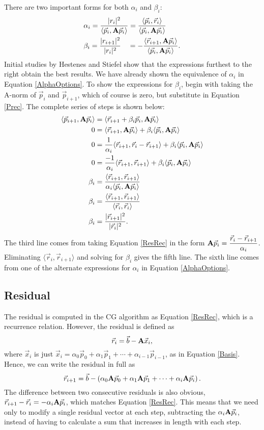 \documentclass[11pt,letterpaper,oneside,notitlepage]{article}	%
\newcommand{\bfa}{{\bf A}}						%
\newcommand{\ip}[2]{\langle \vec #1,\vec #2 \rangle}	%
\newcommand{\aip}[2]{\langle \vec #1,\bfa\vec #2 \rangle}	%
\newcommand{\eq}[1]{Equation \eqref{#1}}		%
\newcommand{\pindent}[1]{\hspace{6mm}}  		%
\numberwithin{equation}{section}				%
\begin{document}
There are two important forms for both $\alpha_i$ and $\beta_i$: 
\begin{align}
&\alpha_i = \dfrac{|r_i|^2}{\aip{p_i}{p_i}} = \dfrac{\ip{p_i}{r_i}}{\aip{p_i}{p_i}} \\
&\beta_i = \dfrac{|r_{i+1}|^2}{|r_i|^2} \quad= -\dfrac{\aip{r_{i+1}}{p_i}}{\aip{p_i}{p_i}}
.\end{align}
Initial studies by Hestenes and Stiefel show that the expressions furthest to the right obtain the best results\cite{CG1952}.  We have already shown the equivalence of $\alpha_i$ in \eq{AlphaOptions}. To show the expressions for $\beta_i$, begin with taking the A-norm of $\vec p_i$ and $\vec p_{i+1}$, which of course is zero, but substitute in \eq{Prec}. The complete series of steps is shown below:
\begin{align*}
\aip{p_{i+1}}{p_i} &= \aip{r_{i+1}+\beta_i\vec p_i}{p_i} \\
0&= \aip{r_{i+1}}{p_i}+\beta_i\aip{p_i}{p_i} \\ 
0&= \frac{1}{\alpha_i}\ip{r_{i+1}}{r_i-\vec r_{i+1}}+\beta_i\aip{p_i}{p_i} \\
0&= \frac{-1}{\alpha_i}\ip{r_{i+1}}{r_{i+1}}+\beta_i\aip{p_i}{p_i} \\
\beta_i &= \dfrac{\ip{r_{i+1}}{r_{i+1}}}{\alpha_i\aip{p_i}{p_i}} \\
\beta_i &= \dfrac{\ip{r_{i+1}}{r_{i+1}}}{\ip{r_i}{r_i}} \\
\beta_i &= \dfrac{|\vec r_{i+1}|^2}{|\vec r_i|^2}
.\end{align*}
The third line comes from taking \eq{ResRec} in the form $\bfa\vec p_i = \dfrac{\vec r_i - \vec r_{i+1}}{\alpha_i}$. Eliminating $\ip{r_i}{r_{i+1}}$ and solving for $\beta_i$ gives the fifth line. The sixth line comes from one of the alternate expressions for $\alpha_i$ in \eq{AlphaOptions}.

\subsection{Residual}%
\pindent{}The residual is computed in the CG algorithm as \eq{ResRec}, which is a recurrence relation. However, the residual is defined as
\begin{equation} \vec r_i = \vec b - \bfa \vec x_i ,\end{equation}
where $\vec x_i$ is just $\vec x_i =\alpha_0 \vec p_0 + \alpha_1 \vec p_1 + \cdots + \alpha_{i-1} \vec p_{i-1}$, as in \eq{Basis}. Hence, we can write the residual in full as
\begin{equation}
\vec r_{i+1} = \vec b - \left ( \alpha_0 \bfa \vec p_0 + \alpha_1 \bfa \vec p_1 + \cdots + \alpha_i \bfa \vec p_i 	\right ) \label{Rez}
.\end{equation}
The difference between two consecutive residuals is also obvious, $\vec r_{i+1}-\vec r_i = -\alpha_i\bfa\vec p_i$, which matches \eq{ResRec}. This means that we need only to modify a single residual vector at each step, subtracting the $\alpha_i \bfa\vec p_i$, instead of having to calculate a sum that increases in length with each step.
\end{document}

